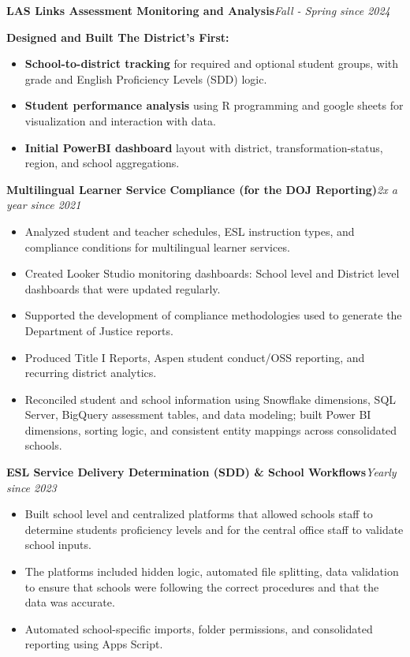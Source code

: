 \documentclass[10pt,letterpaper]{article}
\newcommand{\project}[2]{%
  \par\vspace{5pt}
  {\bfseries\color{navy} #1}\hfill{\small\color{muted}\itshape #2}\par}
\begin{document}
\project{LAS Links Assessment Monitoring and Analysis}{Fall - Spring since 2024}
{\small \textbf{Designed and Built The District's First:}}
\begin{itemize}
  \item \textbf{School-to-district tracking} for required and optional student groups, with grade and English Proficiency Levels (SDD) logic.
  \item \textbf{Student performance analysis} using R programming and google sheets for visualization and interaction with data.
  \item \textbf{Initial PowerBI dashboard} layout with district, transformation-status, region, and school aggregations.
\end{itemize}

\project{Multilingual Learner Service Compliance (for the DOJ Reporting)}{2x a year since 2021}
\begin{itemize}
  \item Analyzed student and teacher schedules, ESL instruction types, and compliance conditions for multilingual learner services.
  \item Created Looker Studio monitoring dashboards: School level and District level dashboards that were updated regularly.
  \item Supported the development of compliance methodologies used to generate the Department of Justice reports.
  \item Produced Title I Reports, Aspen student conduct/OSS reporting, and recurring district analytics.
  \item Reconciled student and school information using Snowflake dimensions, SQL Server, BigQuery assessment tables, and data modeling; built Power BI dimensions, sorting logic, and consistent entity mappings across consolidated schools.
\end{itemize}

\project{ESL Service Delivery Determination (SDD) \& School Workflows}{Yearly since 2023}
\begin{itemize}
  \item Built school level and centralized platforms that allowed schools staff to determine students proficiency levels and for the central office staff to validate school inputs.
  \item The platforms included hidden logic, automated file splitting, data validation to ensure that schools were following the correct procedures and that the data was accurate.
  \item Automated school-specific imports, folder permissions, and consolidated reporting using Apps Script.
\end{itemize}
\end{document}
